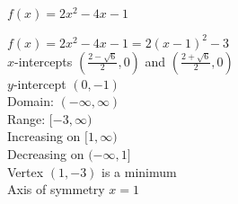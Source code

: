 {$f(x) = 2x^2 - 4x - 1$}
{$f(x) = 2x^2-4x-1 = 2(x-1)^2-3$\\
$x$-intercepts {\small $\left(\frac{2-\sqrt{6}}{2}, 0\right)$ and $\left(\frac{2+\sqrt{6}}{2}, 0\right)$}\\
$y$-intercept $(0, -1)$\\
Domain: $(-\infty, \infty)$ \\
Range: $[-3, \infty)$ \\
Increasing on $[1,\infty)$ \\
Decreasing on $(-\infty,1]$ \\
Vertex $(1, -3)$ is a minimum \\
Axis of symmetry $x = 1$

\begin{center}
\end{center}
}